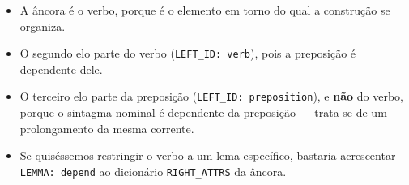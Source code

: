 \documentclass[
  brazilian,
]{article}
\providecommand{\tightlist}{%
  \setlength{\itemsep}{0pt}\setlength{\parskip}{0pt}}
\begin{document}
\begin{itemize}
\tightlist
\item
  A âncora é o verbo, porque é o elemento em torno do qual a construção
  se organiza.
\item
  O segundo elo parte do verbo
  (\texttt{LEFT\_ID:\ \textquotesingle{}verb\textquotesingle{}}), pois a
  preposição é dependente dele.
\item
  O terceiro elo parte da preposição
  (\texttt{LEFT\_ID:\ \textquotesingle{}preposition\textquotesingle{}}),
  e \textbf{não} do verbo, porque o sintagma nominal é dependente da
  preposição --- trata-se de um prolongamento da mesma corrente.
\item
  Se quiséssemos restringir o verbo a um lema específico, bastaria
  acrescentar
  \texttt{\textquotesingle{}LEMMA\textquotesingle{}:\ \textquotesingle{}depend\textquotesingle{}}
  ao dicionário \texttt{RIGHT\_ATTRS} da âncora.
\end{itemize}
\end{document}
